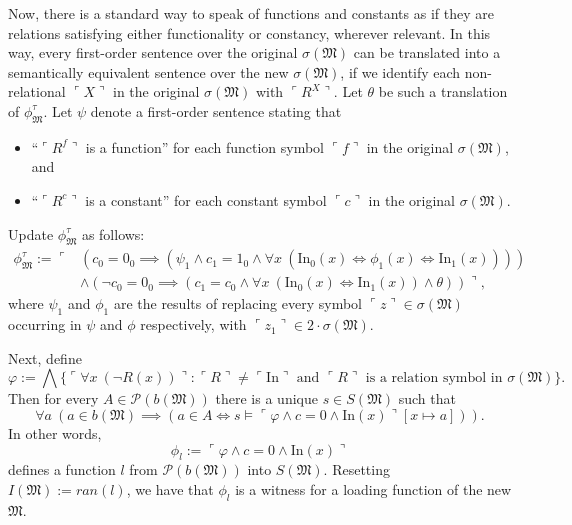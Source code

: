 \documentclass[12pt]{article}
\numberwithin{equation}{section}
\begin{document}
Now, there is a standard way to speak of functions and constants as if they are relations satisfying either functionality or constancy, wherever relevant. In this way, every first-order sentence over the original $\sigma(\mathfrak{M})$ can be translated into a semantically equivalent sentence over the new $\sigma(\mathfrak{M})$, if we identify each non-relational $\ulcorner X \urcorner$ in the original $\sigma(\mathfrak{M})$ with $\ulcorner R^X \urcorner$. Let $\theta$ be such a translation of $\phi^{\tau}_{\mathfrak{M}}$. Let $\psi$ denote a first-order sentence stating that 
\begin{itemize}
    \item ``$\ulcorner R^f \urcorner$ is a function'' for each function symbol $\ulcorner f \urcorner$ in the original $\sigma(\mathfrak{M})$, and
    \item ``$\ulcorner R^c \urcorner$ is a constant'' for each constant symbol $\ulcorner c \urcorner$ in the original $\sigma(\mathfrak{M})$.
\end{itemize}
Update $\phi^{\tau}_{\mathfrak{M}}$ as follows: 
\begin{align*}
    \phi^{\tau}_{\mathfrak{M}} := \ulcorner & (c_0 = 0_0 \implies (\psi_1 \wedge c_1 = 1_0 \wedge \forall x \ (\mathrm{In}_0 (x) \iff \phi_1 (x) \iff \mathrm{In}_1 (x)))) \\
    & \wedge (\neg c_0 = 0_0 \implies (c_1 = c_0 \wedge \forall x \ (\mathrm{In}_0 (x) \iff \mathrm{In}_1 (x)) \wedge \theta)) \urcorner \text{,}
\end{align*}
where $\psi_1$ and $\phi_1$ are the results of replacing every symbol $\ulcorner z \urcorner \in \sigma(\mathfrak{M})$ occurring in $\psi$ and $\phi$ respectively, with $\ulcorner z_1 \urcorner \in 2 \cdot \sigma(\mathfrak{M})$. 

Next, define 
\begin{equation*}
    \varphi := \bigwedge \{\ulcorner \forall x \ (\neg R(x)) \urcorner : \ulcorner R \urcorner \neq \ulcorner \mathrm{In} \urcorner \text{ and } \ulcorner R \urcorner \text{ is a relation symbol in } \sigma(\mathfrak{M})\} \text{.}
\end{equation*}
Then for every $A \in \mathcal{P}(b(\mathfrak{M}))$ there is a unique $s \in S(\mathfrak{M})$ such that 
\begin{equation*}
    \forall a \ (a \in b(\mathfrak{M}) \implies (a \in A \iff s \models \ulcorner \varphi \wedge c = 0 \wedge \mathrm{In}(x) \urcorner [x \mapsto a])) \text{.}
\end{equation*}
In other words, 
\begin{equation*}
    \phi_l := \ulcorner \varphi \wedge c = 0 \wedge \mathrm{In}(x) \urcorner
\end{equation*}
defines a function $l$ from $\mathcal{P}(b(\mathfrak{M}))$ into $S(\mathfrak{M})$. Resetting $I(\mathfrak{M}) := ran(l)$, we have that $\phi_l$ is a witness for a loading function of the new $\mathfrak{M}$. 
\end{document}
